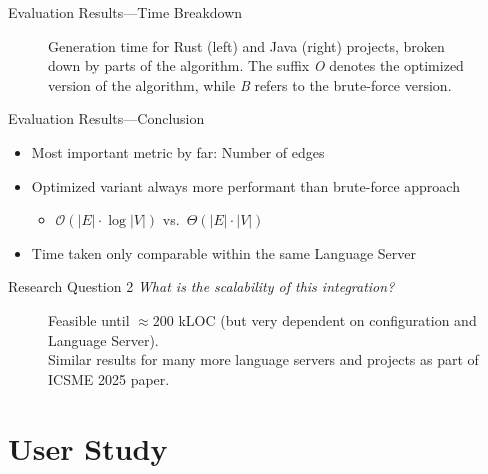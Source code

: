 \documentclass[xcolor={dvipsnames},aspectratio=169,compress,final]{beamer}
\newcommand{\follows}{\raisebox{-0.7mm}{\scalebox{1.4}{\textcolor{Maroon}{\ding{43}}}}}
\newcommand{\answer}[1]{\begin{description}\item[\follows{}]{#1}\end{description}}
\newcommand{\plotornaments}[1]{
  \node[shift={(0.44,-0.47)}](CNW) at (#1.north west) {\pgfornament[color=Gray,width=1cm]{41}};
  \node[shift={(-0.44,-0.47)}](CNE) at (#1.north east) {\pgfornament[color=Gray,width=1cm,symmetry=v]{41}};
  \node[shift={(0.44,0.47)}](CSW) at (#1.south west) {\pgfornament[color=Gray,width=1cm,symmetry=h]{41}};
  \node[shift={(-0.44,0.47)}](CSE) at (#1.south east) {\pgfornament[color=Gray,width=1cm,symmetry=c]{41}};


  \draw[transform canvas={yshift=-1.8mm},line width=1pt,color=Gray] ([xshift=-1.5mm]CNW.north east) -- ([xshift=1.5mm]CNE.north west);
  \draw[transform canvas={yshift=1.8mm},line width=1pt,color=Gray] ([xshift=-1.5mm]CSW.south east) -- ([xshift=1.5mm]CSE.south west);
  \draw[transform canvas={xshift=2.05mm},line width=1pt,color=Gray] ([yshift=1.6mm]CNW.south west) -- ([yshift=-1.6mm]CSW.north west);
  \draw[transform canvas={xshift=-2.05mm},line width=1pt,color=Gray] ([yshift=1.6mm]CNE.south east) -- ([yshift=-1.6mm]CSE.north east);

    \begin{pgfonlayer}{axis ticks}
        \draw[white,thick] (#1.north west) -- (#1.north east);
        \draw[white,thick] (#1.south west) -- (#1.south east);
      \end{pgfonlayer}
}
\begin{document}
{\begin{frame}{Evaluation Results---Time Breakdown}
\begin{figure}
\begin{subfigure}[T]{0.49\textwidth}
\begin{center}
			\end{center}
		\end{subfigure}
		\caption{Generation time for Rust (left) and Java (right) projects, broken down by parts of the algorithm.
			The suffix \emph{O} denotes the optimized version of the algorithm, while \emph{B} refers to the brute-force version.
		}
	\end{figure}
\end{frame}
}

\begin{frame}{Evaluation Results---Conclusion}
	\begin{itemize}
		\item Most important metric by far: Number of edges
		\item Optimized variant always more performant than brute-force approach
		      \begin{itemize}
			      \item $\mathcal{O}(|E| \cdot \log |V|)$ vs.\ $\Theta(|E| \cdot |V|)$
		      \end{itemize}
		\item Time taken only comparable within the same Language Server
	\end{itemize}

	\begin{exampleblock}{Research Question 2}
		\emph{What is the scalability of this integration?}
		\answer{\small Feasible until $\approx 200$ kLOC (but very dependent on configuration and Language Server).\\
			Similar results for many more language servers and projects as part of ICSME 2025 paper.}
	\end{exampleblock}
\end{frame}

\section{User Study}
\end{document}
